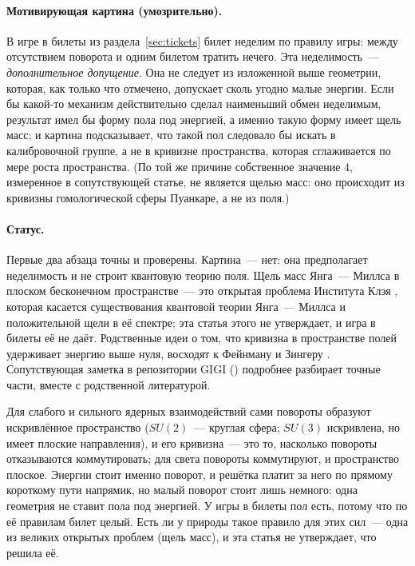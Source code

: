 \paragraph{Мотивирующая картина (умозрительно).} В игре в билеты из раздела~\ref{sec:tickets} билет неделим по правилу
игры: между отсутствием поворота и одним билетом тратить нечего. Эта неделимость~--- \emph{дополнительное допущение}.
Она не следует из изложенной выше геометрии, которая, как только что отмечено, допускает сколь угодно малые
энергии. Если бы какой-то механизм действительно сделал наименьший обмен неделимым, результат имел бы форму пола
под энергией, а именно такую форму имеет щель масс; и картина подсказывает, что такой пол следовало бы искать в
калибровочной группе, а не в кривизне пространства, которая сглаживается по мере роста пространства. (По той же причине
собственное значение $4$, измеренное в сопутствующей статье, не является щелью масс: оно происходит из кривизны
гомологической сферы Пуанкаре, а не из поля.)

\paragraph{Статус.} Первые два абзаца точны и проверены. Картина~--- нет: она предполагает неделимость
и не строит квантовую теорию поля. Щель масс Янга~--- Миллса в плоском бесконечном пространстве~--- это открытая
проблема Института Клэя \cite{jaffewitten}, которая касается существования квантовой теории Янга~--- Миллса и
положительной щели в её спектре; эта статья этого не утверждает, и игра в билеты её не даёт. Родственные идеи о том, что кривизна в пространстве полей удерживает
энергию выше нуля, восходят к Фейнману \cite{feynman} и Зингеру \cite{singer}. Сопутствующая
заметка в репозитории GIGI ()
подробнее разбирает точные части, вместе с родственной литературой.

\begin{plain}
Для слабого и сильного ядерных взаимодействий сами повороты образуют искривлённое пространство ($SU(2)$~--- круглая сфера;
$SU(3)$ искривлена, но имеет плоские направления), и его кривизна~--- это то, насколько повороты отказываются коммутировать;
для света повороты коммутируют, и пространство плоское. Энергии стоит именно поворот, и решётка платит за него по прямому
короткому пути напрямик, но малый поворот стоит лишь немного: одна геометрия не ставит пола под энергией. У игры в билеты
пол есть, потому что по её правилам билет целый. Есть ли у природы такое правило для этих сил~--- одна из
великих открытых проблем (щель масс), и эта статья не утверждает, что решила её.
\end{plain}

